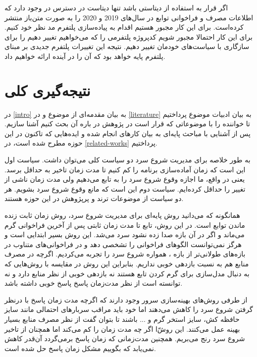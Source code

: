 اگر قرار به استفاده از دیتاستی باشد تنها دیتاست در دسترس در \cite{AzurePublicDataset} وجود دارد که اطلاعات مصرف و فراخوانی توابع در سال‌های 2019 و 2020 را به صورت متن‌باز منتشر کرده‌است. برای این کار مجبور هستیم اقدام به پیاده‌سازی پلتفرم مد نظر خود کنیم. برای این کار احتمالا مجبور شویم کدپروژه پلتفرمی را که می‌خواهیم تغییر دهیم را برای سازگاری با سیاست‌های خودمان تغییر دهیم. نتیجه این تغییرات پلتفرم جدیدی بر مبنای پلتفرم پایه خواهد بود که آن را در آینده ارائه خواهیم داد. 










\section{نتیجه‌گیری کلی}

در \autoref{intro} به بیان مقدمه‌ای از موضوع و در \autoref{literature} به بیان ادبیات موضوع پرداختیم تا خواننده را با موضوعاتی که قرار است در پژوهش در باره آن بحث کنیم آشنا سازیم. پس از آشنایی با مباحث پایه‌ای به بیان کارهای انجام شده و ایده‌هایی که تاکنون در این حوزه مطرح شده است، در \autoref{related-works} پرداختیم. 

به طور خلاصه برای مدیریت شروع سرد دو سیاست کلی می‌توان داشت. سیاست اول این است که زمان آماده‌سازی برنامه را کم کنیم تا مدت زمان تاخیر به حداقل برسد. یعنی در واقع، ما اجازه وقوع شروع سرد را به تابع می‌دهیم ولی مدت‌ زمان ناشی از تغییر را حداقل کرده‌ایم. سیاست دوم این است که مانع وقوع شروع سرد بشویم. هر دو سیاست از موضوعات ترند و پرپژوهش در این حوزه هستند. 

همانگونه که می‌دانید روش پایه‌ای برای مدیریت شروع سرد، روش زمان ثابت زنده ماندن توابع است. در این روش، تابع تا مدت زمان ثابتی پس از آخرین فراخوانی گرم می‌ماند و اگر در آن بازه صدا زده نشود سرد می‌شد. این روش بسیر ابتدایی است و هرگز نمی‌توانست الگو‌های فراخوانی را تشخصی دهد و در فراخوانی‌های متناوب در بازه‌های طولانی‌تر از بازه ، همواره شروع سرد را تجربه می‌کردیم. اگرچه در مصرف منابع هم به نسبت بازدهی خوبی نداریم. بنابراین این روش در مقایسه با روش‌هایی که به دنبال مدل‌سازی برای گرم کردن تابع هستند نه بازدهی خوبی از نظر منابع دارد و نه توانسته است از نظر مدت‌زمان پاسخ پاسخ خوبی داشته باشد. 

از طرفی روش‌های بهینه‌سازی سرور وجود دارند که اگرچه مدت زمان پاسخ با درنظر گرفتن شروع سرد را کاهش می‌دهند اما خود باید مراقب سربارهای احتمالی مانند سایز حافظه کش، سایز استخر گرم و ... باشند تا بتوان گفت از نظر مصرف منابع بسیار بهینه عمل می‌کنند. این روش‌ّا اگر چه مدت زمان را کم می‌کند اما همچنان از تاخیر شروع سرد رنج می‌بریم. همچنین مدت‌زمانی که زمان پاسخ برمی‌گردد آن‌قدر کاهش نمی‌یابد که بگوییم مشکل زمان پاسخ حل شده است.

